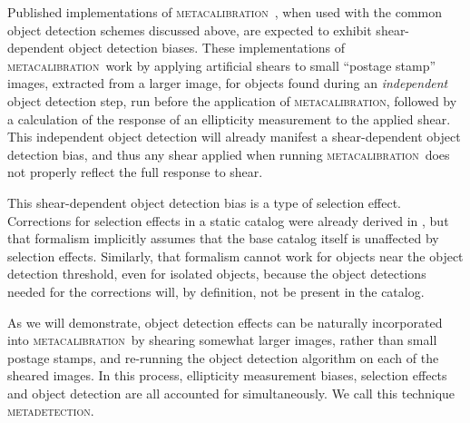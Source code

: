 \documentclass[fleqn,useAMS,usenatbib]{mnras}
\newcommand{\mcal}{\textsc{metacalibration}}
\newcommand{\mdet}{\textsc{metadetection}}
\begin{document}
Published implementations of \mcal\
\citep[e.g.,][]{HuffMcal2017,SheldonMcal2017}, when used with the common object
detection schemes discussed above, are expected to exhibit shear-dependent
object detection biases. These implementations of \mcal\ work by applying
artificial shears to small ``postage stamp'' images, extracted from a larger
image, for objects found during an {\em independent} object detection step, run
before the application of \mcal, followed by a calculation of the response of
an ellipticity measurement to the applied shear. This independent object
detection will already manifest a shear-dependent object detection bias, and
thus any shear applied when running \mcal\ does not properly reflect the full
response to shear.

This shear-dependent object detection bias is a type of selection effect.
Corrections for selection effects in a static catalog were already derived in
\cite{SheldonMcal2017}, but that formalism implicitly assumes that the base
catalog itself is unaffected by selection effects.  Similarly, that formalism
cannot work for objects near the object detection threshold, even for isolated
objects, because the object detections needed for the corrections will, by
definition, not be present in the catalog.

As we will demonstrate, object detection effects can be naturally incorporated
into \mcal\ by shearing somewhat larger images, rather than small postage
stamps, and re-running the object detection algorithm on each of the sheared
images. In this process, ellipticity measurement biases, selection effects and
object detection are all accounted for simultaneously. We call this technique
\mdet.

\end{document}

